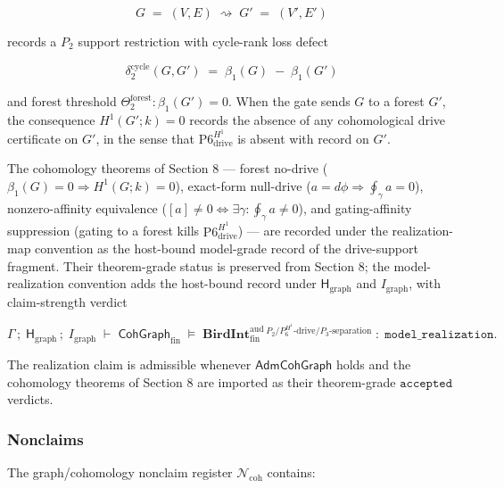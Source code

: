 \documentclass[11pt]{article}
\theoremstyle{definition}
\begin{document}
\[
G\;=\;(V,E)\;\rightsquigarrow\;G'\;=\;(V',E')
\]

records a \(P_{2}\) support restriction with cycle-rank loss defect

\[
\delta_{2}^{\mathrm{cycle}}(G,G')\;=\;\beta_{1}(G)\;-\;\beta_{1}(G')
\]

and forest threshold \(\Theta_{2}^{\mathrm{forest}}:\beta_{1}(G')=0\). When the gate sends \(G\) to a forest \(G'\), the consequence \(H^{1}(G';k)=0\) records the absence of any cohomological drive certificate on \(G'\), in the sense that \(\mathrm{P6}_{\mathrm{drive}}^{H^1}\) is absent with record on \(G'\).

The cohomology theorems of Section 8 --- forest no-drive (\(\beta_{1}(G)=0\Rightarrow H^{1}(G;k)=0\)), exact-form null-drive (\(a=d\phi\Rightarrow\oint_{\gamma}a=0\)), nonzero-affinity equivalence (\([a]\neq 0\iff\exists\gamma:\oint_{\gamma}a\neq 0\)), and gating-affinity suppression (gating to a forest kills \(\mathrm{P6}_{\mathrm{drive}}^{H^1}\)) --- are recorded under the realization-map convention as the host-bound model-grade record of the drive-support fragment. Their theorem-grade status is preserved from Section 8; the model-realization convention adds the host-bound record under \(\mathsf H_{\mathrm{graph}}\) and \(I_{\mathrm{graph}}\), with claim-strength verdict

\[
\Gamma\,;\;\mathsf H_{\mathrm{graph}}\,;\;I_{\mathrm{graph}}\;\vdash\;\mathsf{CohGraph}_{\mathrm{fin}}\;\models\;\mathbf{BirdInt}^{\mathrm{aud}}_{\mathrm{fin}}{}^{\,P_{2}/P_{6}^{H^{1}}\text{-drive}/P_{3}\text{-separation}}\;:\;\texttt{model\_realization}.
\]

The realization claim is admissible whenever \(\mathsf{AdmCohGraph}\) holds and the cohomology theorems of Section 8 are imported as their theorem-grade \(\texttt{accepted}\) verdicts.

\subsubsection{Nonclaims}

The graph/cohomology nonclaim register \(\mathcal N_{\mathrm{coh}}\) contains:
\end{document}
